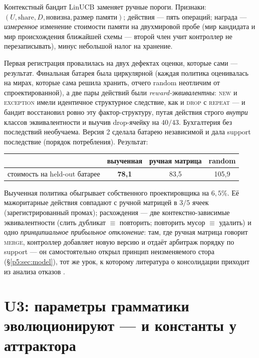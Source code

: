 \documentclass{article}
\begin{document}
Контекстный бандит LinUCB заменяет ручные пороги. Признаки: $(U,
\text{share}, D, \text{новизна}, \text{размер памяти})$; действия ---
пять операций; награда --- \emph{измеренное} изменение стоимости
памяти на двухмировой пробе (мир кандидата и мир происхождения
ближайшей схемы --- второй член учит контроллер не перезаписывать),
минус небольшой налог на хранение.

Первая регистрация провалилась на двух дефектах оценки, которые сами
--- результат. Финальная батарея была циркулярной (каждая политика
оценивалась на мирах, которые сама решила хранить, отчего random
неотличим от спроектированной), а две пары действий были
\emph{reward-эквивалентны}: \textsc{new} и \textsc{exception} имели
идентичное структурное следствие, как и \textsc{drop} с
\textsc{repeat} --- и бандит восстановил ровно эту фактор-структуру,
путая действия строго \emph{внутри} классов эквивалентности и выучив
drop-ячейку на $40/43$. Бухгалтерия без последствий необучаема.
Версия 2 сделала батарею независимой и дала support последствие
(порядок потребления). Результат:

\begin{center}
\small
\begin{tabular}{lccc}
\toprule
 & выученная & ручная матрица & random \\
\midrule
стоимость на held-out батарее & \textbf{78{,}1} & 83{,}5 & 105{,}9 \\
\bottomrule
\end{tabular}
\end{center}

Выученная политика обыгрывает собственного проектировщика на
$6{,}5\%$. Её мажоритарные действия совпадают с ручной матрицей в
$3/5$ ячеек (зарегистрированный промах); расхождения --- две
контекстно-зависимые эквивалентности (слить дубликат $\equiv$
повторить; повторить мусор $\equiv$ удалить) и одно
\emph{принципиальное прибыльное отклонение}: там, где ручная матрица
говорит \textsc{merge}, контроллер добавляет новую версию и отдаёт
арбитраж порядку по support --- он самостоятельно открыл принцип
неизменяемого стора (\S\ref{p5:sec:model}), тот же урок, к которому
литература о консолидации приходит из анализа отказов
\citep{trustmem2026,faulty2026}.

\section{U3: параметры грамматики эволюционируют --- и константы у аттрактора}
\label{p5:sec:u3}
\end{document}
